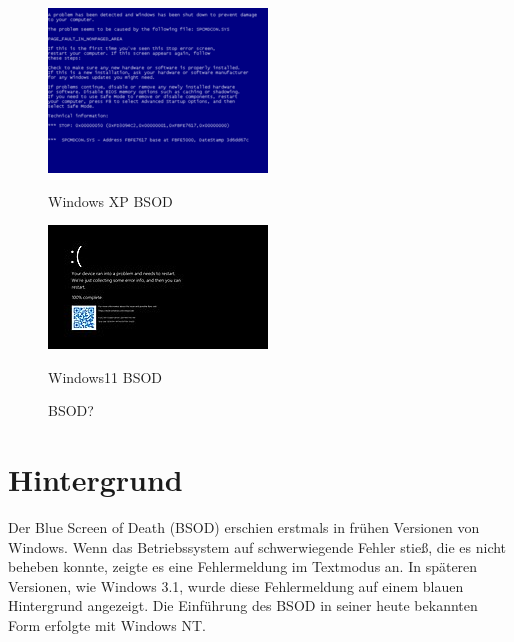 \documentclass[paper=a4,fontsize=12pt,ngerman,parskip=half]{scrartcl}
\begin{document}
\begin{figure}[!ht]
\begin{minipage}[b]{0.3\textwidth}
    \includegraphics[width=\textwidth]{graphics/Pic/day 2/220px-Windows_XP_BSOD.png}
    \caption{Windows XP BSOD}
    \label{fig:image_three}
  \end{minipage}
  \hfill
  \begin{minipage}[b]{0.3\textwidth}
    \centering
    \includegraphics[width=\textwidth]{graphics/Pic/day 2/Windows11BSOD.jpg}
    \caption{Windows11 BSOD}
    \label{fig:image_four}
  \end{minipage}
  \caption{BSOD?}
  \label{fig:images_img}
\end{figure}

\pagebreak

\section{Hintergrund}

Der Blue Screen of Death (BSOD) erschien erstmals in frühen Versionen von Windows. Wenn das Betriebssystem auf schwerwiegende Fehler stieß, die es nicht beheben konnte, zeigte es eine Fehlermeldung im Textmodus an. In späteren Versionen, wie Windows 3.1, wurde diese Fehlermeldung auf einem blauen Hintergrund angezeigt. Die Einführung des BSOD in seiner heute bekannten Form erfolgte mit Windows NT.\cite{wikipedia}
\end{document}

